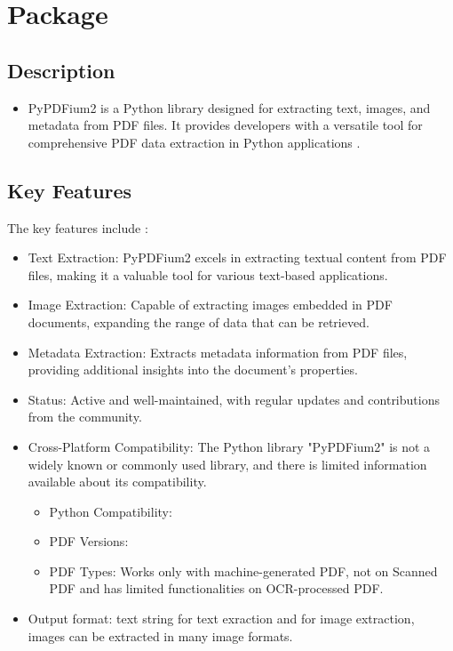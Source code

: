\chapter{Package } %
\section{Description}

\begin{itemize}
    \item PyPDFium2 is a Python library designed for extracting text, images, and metadata from PDF files. It provides developers with a versatile tool for comprehensive PDF data extraction in Python applications \cite{pypdfium2:2024}.
\end{itemize}

\section{Key Features}

The key features include \cite{pypdfium2:2024}: 
\begin{itemize}
    \item Text Extraction: PyPDFium2 excels in extracting textual content from PDF files, making it a valuable tool for various text-based applications.
    \item Image Extraction: Capable of extracting images embedded in PDF documents, expanding the range of data that can be retrieved.
    \item Metadata Extraction: Extracts metadata information from PDF files, providing additional insights into the document's properties.
    \item Status: Active and well-maintained, with regular updates and contributions from the community.
    \item Cross-Platform Compatibility: The Python library "PyPDFium2" is not a widely known or commonly used library, and there is limited information available about its compatibility.
    \begin{itemize}
    	\item Python Compatibility: 
    	\item PDF Versions: 
    	\item PDF Types:  Works only with machine-generated PDF, not on Scanned PDF and has limited functionalities on OCR-processed PDF. 
    \end{itemize}
    \item Output format: text string for text exraction and for image extraction, images can be extracted in many image formats.
    \end{itemize}

